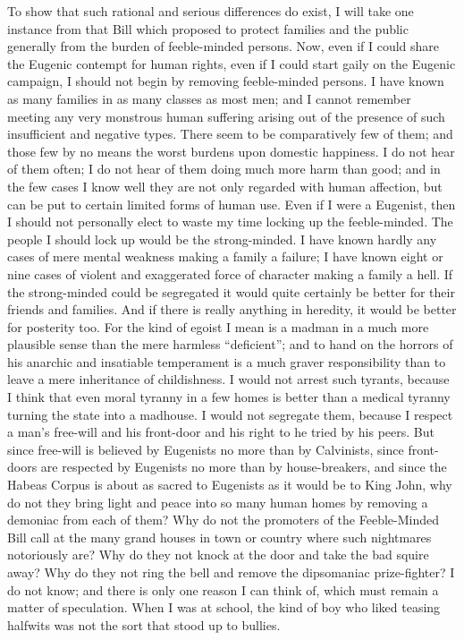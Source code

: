 \documentclass{book}
\begin{document}
To show that such rational and serious differences do exist, I will take one instance from that Bill which proposed to protect families and the public generally from the burden of feeble-minded persons. Now, even if I could share the Eugenic contempt for human rights, even if I could start gaily on the Eugenic campaign, I should not begin by removing feeble-minded persons. I have known as many families in as many classes as most men; and I cannot remember meeting any very monstrous human suffering arising out of the presence of such insufficient and negative types. There seem to be comparatively few of them; and those few by no means the worst burdens upon domestic happiness. I do not hear of them often; I do not hear of them doing much more harm than good; and in the few cases I know well they are not only regarded with human affection, but can be put to certain limited forms of human use. Even if I were a Eugenist, then I should not personally elect to waste my time locking up the feeble-minded. The people I should lock up would be the strong-minded. I have known hardly any cases of mere mental weakness making a family a failure; I have known eight or nine cases of violent and exaggerated force of character making a family a hell. If the strong-minded could be segregated it would quite certainly be better for their friends and families. And if there is really anything in heredity, it would be better for posterity too. For the kind of egoist I mean is a madman in a much more plausible sense than the mere harmless “deficient”; and to hand on the horrors of his anarchic and insatiable temperament is a much graver responsibility than to leave a mere inheritance of childishness. I would not arrest such tyrants, because I think that even moral tyranny in a few homes is better than a medical tyranny turning the state into a madhouse. I would not segregate them, because I respect a man’s free-will and his front-door and his right to he tried by his peers. But since free-will is believed by Eugenists no more than by Calvinists, since front-doors are respected by Eugenists no more than by house-breakers, and since the Habeas Corpus is about as sacred to Eugenists as it would be to King John, why do not they bring light and peace into so many human homes by removing a demoniac from each of them? Why do not the promoters of the Feeble-Minded Bill call at the many grand houses in town or country where such nightmares notoriously are? Why do they not knock at the door and take the bad squire away? Why do they not ring the bell and remove the dipsomaniac prize-fighter? I do not know; and there is only one reason I can think of, which must remain a matter of speculation. When I was at school, the kind of boy who liked teasing halfwits was not the sort that stood up to bullies.
\end{document}
